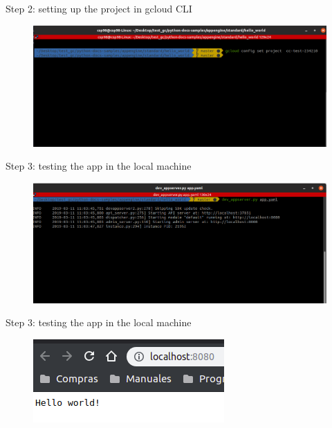 \documentclass{beamer}
\begin{document}
\begin{frame}[fragile]{Step 2: setting up the project in gcloud CLI}
    \begin{figure}[H]
      \centering
      \includegraphics[scale=0.33]{../img/tutorial/3setproject}
    \end{figure}
\end{frame}

\begin{frame}[fragile]{Step 3: testing the app in the local machine}
    \begin{figure}[H]
      \centering
      \includegraphics[scale=0.33]{../img/tutorial/4localdeploy}
    \end{figure}
\end{frame}

\begin{frame}[fragile]{Step 3: testing the app in the local machine}
    \begin{figure}[H]
      \centering
      \includegraphics[scale=1]{../img/tutorial/5localbrowse}
    \end{figure}
\end{frame}
\end{document}

